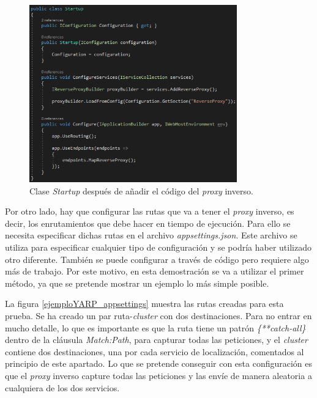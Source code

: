 \documentclass[11pt,spanish,listoffigures]{tfgetsinf}
\begin{document}
\begin{figure}[ht]
\centering
\includegraphics[width=0.8\textwidth]{imagenes/ejemploYARP/startup}
\caption{Clase \emph{Startup} después de añadir el código del \emph{proxy} inverso.}
	\label{ejemploYARP_startup}
\end{figure}

Por otro lado, hay que configurar las rutas que va a tener el \emph{proxy} inverso, es decir, los enrutamientos que debe hacer en tiempo de ejecución. Para ello se necesita especificar dichas rutas en el archivo \emph{appsettings.json}. Este archivo se utiliza para especificar cualquier tipo de configuración y se podría haber utilizado otro diferente. También se puede configurar a través de código pero requiere algo más de trabajo. Por este motivo, en esta demostración se va a utilizar el primer método, ya que se pretende mostrar un ejemplo lo más simple posible.

La figura \ref{ejemploYARP_appsettings} muestra las rutas creadas para esta prueba. Se ha creado un par ruta-\emph{cluster} con dos destinaciones. Para no entrar en mucho detalle, lo que es importante es que la ruta tiene un patrón \emph{\{**catch-all\}} dentro de la cláusula \emph{Match:Path}, para capturar todas las peticiones, y el \emph{cluster} contiene dos destinaciones, una por cada servicio de localización, comentados al principio de este apartado. Lo que se pretende conseguir con esta configuración es que el \emph{proxy} inverso capture todas las peticiones y las envíe de manera aleatoria a cualquiera de los dos servicios.
\end{document}
